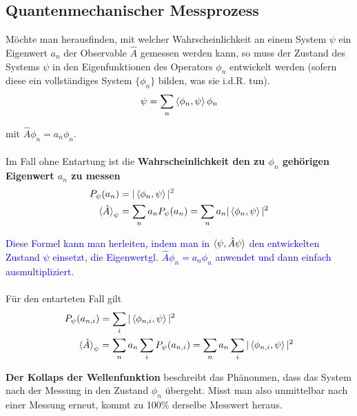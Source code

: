 \documentclass{article}
\begin{document}
\newpage


\subsection{Quantenmechanischer Messprozess}
Möchte man herausfinden, mit welcher Wahrscheinlichkeit an einem System $\psi$ ein Eigenwert $a_n$ der Observable $\hat{A}$ gemessen werden kann, so muss der Zustand des Systems $\psi$ in den Eigenfunktionen des Operators $\phi_n$ entwickelt werden \textcolor{gruen}{(sofern diese ein vollständiges System $\{\phi_n\}$ bilden, was sie i.d.R. tun)}.
	\begin{equation}
		\psi = \sum_n \braket{\phi_n, \psi} \phi_n
	\end{equation}

mit $\hat{A}\phi_n = a_n\phi_n$.\\
\\
Im Fall ohne Entartung ist die \textbf{Wahrscheinlichkeit den zu $\phi_n$ gehörigen Eigenwert $a_n$ zu messen} 
	\begin{align}
		P_\psi(a_n) &= |\braket{\phi_n, \psi}|^2 \\
		\braket{\hat{A}}_\psi &= \sum_n a_n P_\psi(a_n) = \sum_n a_n |\braket{\phi_n, \psi}|^2
	\end{align}

\textcolor{blue}{Diese Formel kann man herleiten, indem man in $\braket{\psi,\hat{A}\psi}$ den entwickelten Zustand $\psi$ einsetzt, die Eigenwertgl. $\hat{A}\phi_n = a_n\phi_n$ anwendet und dann einfach ausmultipliziert.}\\
\\
Für den entarteten Fall gilt
	\begin{align}
		P_\psi(a_{n,i}) &= \sum_i|\braket{\phi_{n,i}, \psi}|^2 \\
		\braket{\hat{A}}_\psi &= \sum_n a_n \sum_i P_\psi(a_{n,i}) = \sum_n a_n \sum_i |\braket{\phi_{n,i}, \psi}|^2
	\end{align}


\textbf{Der Kollaps der Wellenfunktion} beschreibt das Phänonmen, dass das System nach der Messung in den Zustand $\phi_n$ übergeht. Misst man also unmittelbar nach einer Messung erneut, kommt zu 100\% derselbe Messwert heraus.


\newpage
\end{document}
